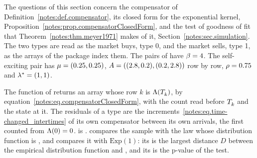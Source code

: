 The questions of this section concern the compensator of Definition~\ref{notes:def.compensator},
its closed form for the exponential kernel, Proposition~\ref{notes:prop.compensatorClosedForm},
and the test of goodness of fit that Theorem~\ref{notes:thm.meyer1971} makes of it,
Section~\ref{notes:sec.simulation}.
The two types are read as the market buys, type 0, and the market sells, type 1,
as the arrays of the package index them.
The pairs of  have $\decay = 4$.
The self-exciting pair has $\baseIntensity = (0.25, 0.25)$,
$\excitation = ((2.8, 0.2), (0.2, 2.8))$ row by row,
$\branchingRatio = 0.75$ and $\stationaryIntensity = (1, 1)$.

The function  of 
returns an array whose row $k$ is $\compensator(\arrivalTimes[ ]_k)$,
by equation~\eqref{notes:eq.compensatorClosedForm},
with the count read before $\arrivalTimes[ ]_k$ and the state at it.
The residuals of a type are the increments~\eqref{notes:eq.time-changed_intertimes}
of its own compensator between its own arrivals, the first counted from $\compensator(0) = 0$.
 is .
 compares the sample  with the law whose distribution function is ,
and  compares it with $\mathrm{Exp}(1)$:
its  is the largest distance $D$ between the empirical distribution function and ,
and its  is the p-value of the test.

